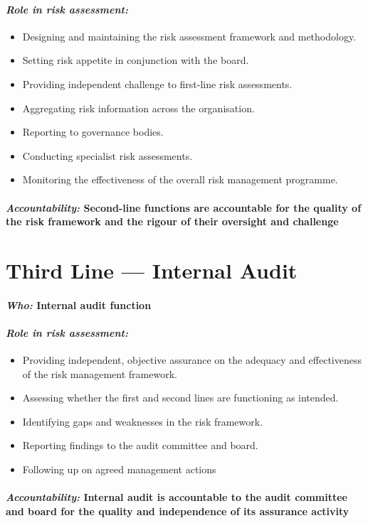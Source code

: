 \paragraph{\textit{Role in risk assessment:}}
\begin{itemize}
  \item{Designing and maintaining the risk assessment framework and methodology.}
  \item{Setting risk appetite in conjunction with the board.}
  \item{Providing independent challenge to first-line risk assessments.}
  \item{Aggregating risk information across the organisation.}
  \item{Reporting to governance bodies.}
  \item{Conducting specialist risk assessments.}
  \item{Monitoring the effectiveness of the overall risk management programme.}
\end{itemize}
\paragraph{\textit{Accountability:} Second-line functions are accountable for the quality of the risk framework and the rigour of their oversight and challenge}

\section*{Third Line — Internal Audit}
\paragraph{\textit{Who:} Internal audit function}
\paragraph{\textit{Role in risk assessment:}}
\begin{itemize}
  \item{Providing independent, objective assurance on the adequacy and effectiveness of the risk management framework.}
  \item{Assessing whether the first and second lines are functioning as intended.}
  \item{Identifying gaps and weaknesses in the risk framework.}
  \item{Reporting findings to the audit committee and board.}
  \item{Following up on agreed management actions}
\end{itemize}
\paragraph{\textit{Accountability:} Internal audit is accountable to the audit committee and board for the quality and independence of its assurance activity}
